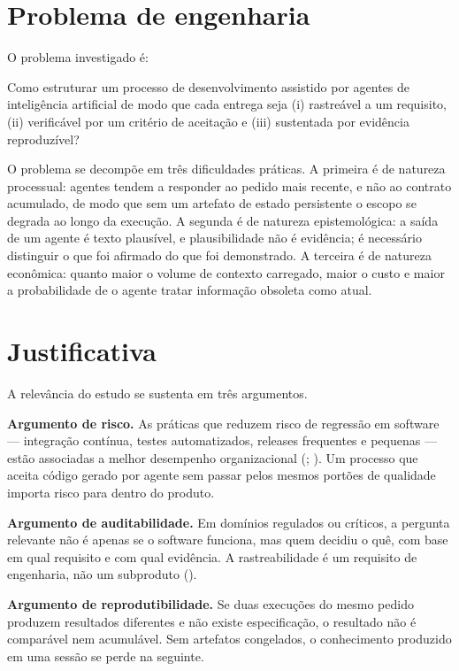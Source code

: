 \section{Problema de engenharia}
\label{sec:problema}

O problema investigado é:

\begin{citacao}
	Como estruturar um processo de desenvolvimento assistido por agentes de
	inteligência artificial de modo que cada entrega seja (i) rastreável a um
	requisito, (ii) verificável por um critério de aceitação e (iii) sustentada
	por evidência reproduzível?
\end{citacao}

O problema se decompõe em três dificuldades práticas. A primeira é de natureza
processual: agentes tendem a responder ao pedido mais recente, e não ao contrato
acumulado, de modo que sem um artefato de estado persistente o escopo se degrada
ao longo da execução. A segunda é de natureza epistemológica: a saída de um
agente é texto plausível, e plausibilidade não é evidência; é necessário
distinguir o que foi afirmado do que foi demonstrado. A terceira é de natureza
econômica: quanto maior o volume de contexto carregado, maior o custo e maior a
probabilidade de o agente tratar informação obsoleta como atual.

\section{Justificativa}
\label{sec:justificativa}

A relevância do estudo se sustenta em três argumentos.

\textbf{Argumento de risco.} As práticas que reduzem risco de regressão em
software --- integração contínua, testes automatizados, releases frequentes e
pequenas --- estão associadas a melhor desempenho organizacional
(; ). Um processo que aceita
código gerado por agente sem passar pelos mesmos portões de qualidade importa
risco para dentro do produto.

\textbf{Argumento de auditabilidade.} Em domínios regulados ou críticos, a
pergunta relevante não é apenas se o software funciona, mas quem decidiu o quê,
com base em qual requisito e com qual evidência. A rastreabilidade é um requisito
de engenharia, não um subproduto ().

\textbf{Argumento de reprodutibilidade.} Se duas execuções do mesmo pedido
produzem resultados diferentes e não existe especificação, o resultado não é
comparável nem acumulável. Sem artefatos congelados, o conhecimento produzido em
uma sessão se perde na seguinte.

